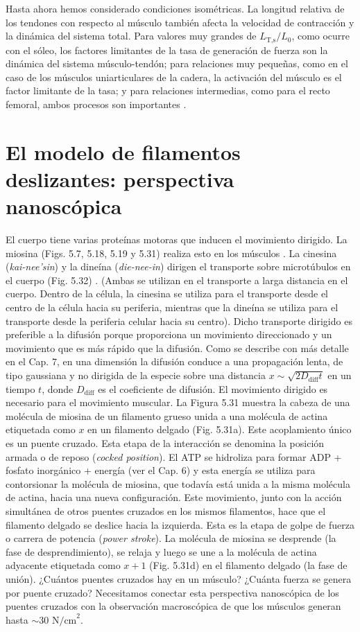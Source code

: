 \documentclass[12pt]{book}
\begin{document}
Hasta ahora hemos considerado condiciones isométricas. La longitud relativa de los tendones con respecto al músculo también afecta la velocidad de contracción y la dinámica del sistema total. Para valores muy grandes de $L_{\text{T,s}}/L_0$, como ocurre con el sóleo, los factores limitantes de la tasa de generación de fuerza son la dinámica del sistema músculo-tendón; para relaciones muy pequeñas, como en el caso de los músculos uniarticulares de la cadera, la activación del músculo es el factor limitante de la tasa; y para relaciones intermedias, como para el recto femoral, ambos procesos son importantes \cite{82}.

\section{El modelo de filamentos deslizantes: perspectiva nanoscópica}

El cuerpo tiene varias proteínas motoras que inducen el movimiento dirigido. La miosina (Figs. 5.7, 5.18, 5.19 y 5.31) realiza esto en los músculos \cite{62}. La cinesina (\textit{kai-nee'sin}) y la dineína (\textit{die-nee-in}) dirigen el transporte sobre microtúbulos en el cuerpo (Fig. 5.32) \cite{6, 10, 11, 24, 27, 42, 69, 74}. (Ambas se utilizan en el transporte a larga distancia en el cuerpo. Dentro de la célula, la cinesina se utiliza para el transporte desde el centro de la célula hacia su periferia, mientras que la dineína se utiliza para el transporte desde la periferia celular hacia su centro). Dicho transporte dirigido es preferible a la difusión porque proporciona un movimiento direccionado y un movimiento que es más rápido que la difusión. Como se describe con más detalle en el Cap. 7, en una dimensión la difusión conduce a una propagación lenta, de tipo gaussiana y no dirigida de la especie sobre una distancia $x \sim \sqrt{2 D_{\text{diff}} t}$ en un tiempo $t$, donde $D_{\text{diff}}$ es el coeficiente de difusión. El movimiento dirigido es necesario para el movimiento muscular. La Figura 5.31 muestra la cabeza de una molécula de miosina de un filamento grueso unida a una molécula de actina etiquetada como $x$ en un filamento delgado (Fig. 5.31a). Este acoplamiento único es un puente cruzado. Esta etapa de la interacción se denomina la posición armada o de reposo (\textit{cocked position}). El ATP se hidroliza para formar ADP + fosfato inorgánico + energía (ver el Cap. 6) y esta energía se utiliza para contorsionar la molécula de miosina, que todavía está unida a la misma molécula de actina, hacia una nueva configuración. Este movimiento, junto con la acción simultánea de otros puentes cruzados en los mismos filamentos, hace que el filamento delgado se deslice hacia la izquierda. Esta es la etapa de golpe de fuerza o carrera de potencia (\textit{power stroke}). La molécula de miosina se desprende (la fase de desprendimiento), se relaja y luego se une a la molécula de actina adyacente etiquetada como $x + 1$ (Fig. 5.31d) en el filamento delgado (la fase de unión). ¿Cuántos puentes cruzados hay en un músculo? ¿Cuánta fuerza se genera por puente cruzado? Necesitamos conectar esta perspectiva nanoscópica de los puentes cruzados con la observación macroscópica de que los músculos generan hasta $\sim 30\text{ N/cm}^2$.
\end{document}
